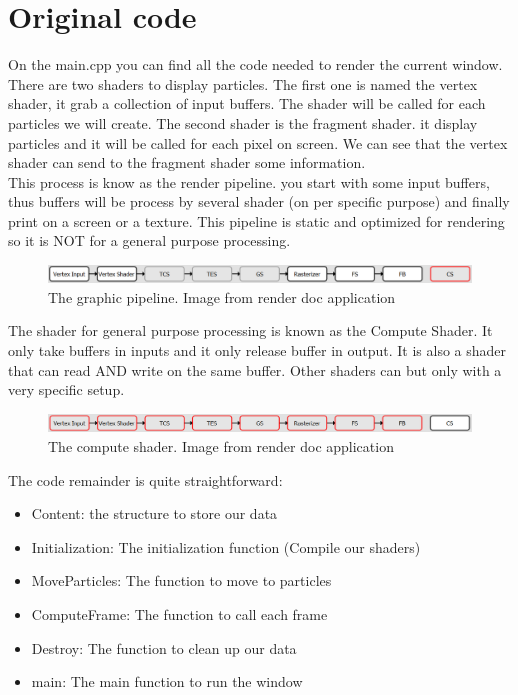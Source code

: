 \documentclass{article}
\begin{document}
\section{Original code}
On the main.cpp you can find all the code needed to render the current window. There are two shaders to display particles. The first one is named the vertex shader, it grab a collection of input buffers. The shader will be called for each particles we will create. The second shader is the fragment shader. it display particles and it will be called for each pixel on screen. We can see that the vertex shader can send to the fragment shader some information.\\
This process is know as the render pipeline. you start with some input buffers, thus buffers will be process by several shader (on per specific purpose) and finally print on a screen or a texture. This pipeline is static and optimized for rendering so it is NOT for a general purpose processing.
\begin{figure}[H]
	\centering
	\includegraphics[scale=0.5]{images/rendering_pipeline.png}
	\caption{The graphic pipeline. Image from render doc application}
\end{figure}
The shader for general purpose processing is known as the Compute Shader. It only take buffers in inputs and it only release buffer in output. It is also a shader that can read AND write on the same buffer. Other shaders can but only with a very specific setup.
\begin{figure}[H]
	\centering
	\includegraphics[scale=0.5]{images/compute_pipeline.png}
	\caption{The compute shader. Image from render doc application}
\end{figure}

The code remainder is quite straightforward:
\begin{itemize}
	\item Content: the structure to store our data
	\item Initialization: The initialization function (Compile our shaders)
	\item MoveParticles: The function to move to particles
	\item ComputeFrame: The function to call each frame
	\item Destroy: The function to clean up our data
	\item main: The main function to run the window
\end{itemize}
\end{document}
